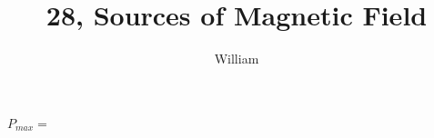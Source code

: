 \documentclass[11pt]{article}
\author{William}
\title{28, Sources of Magnetic Field}
\begin{document}
    \maketitle
    \begin{flushleft}
        
        $P_{max} =$

    \end{flushleft}
\end{document}
